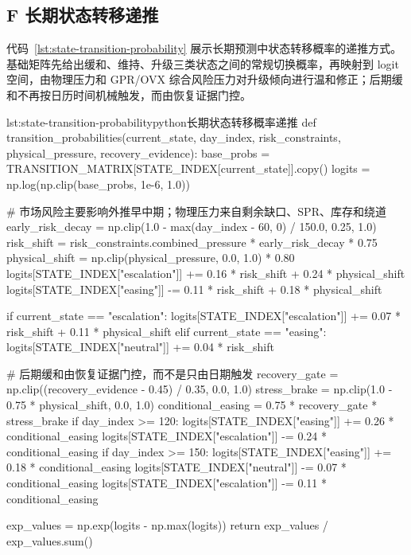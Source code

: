 \clearpage

\subsection*{F 长期状态转移递推}

代码~\ref{lst:state-transition-probability} 展示长期预测中状态转移概率的递推方式。基础矩阵先给出缓和、维持、升级三类状态之间的常规切换概率，再映射到 logit 空间，由物理压力和 GPR/OVX 综合风险压力对升级倾向进行温和修正；后期缓和不再按日历时间机械触发，而由恢复证据门控。

\begin{paperlisting}{lst:state-transition-probability}{python}{长期状态转移概率递推}
def transition_probabilities(current_state, day_index, risk_constraints,
                             physical_pressure, recovery_evidence):
    base_probs = TRANSITION_MATRIX[STATE_INDEX[current_state]].copy()
    logits = np.log(np.clip(base_probs, 1e-6, 1.0))

    # 市场风险主要影响外推早中期；物理压力来自剩余缺口、SPR、库存和绕道
    early_risk_decay = np.clip(1.0 - max(day_index - 60, 0) / 150.0,
                               0.25, 1.0)
    risk_shift = risk_constraints.combined_pressure * early_risk_decay * 0.75
    physical_shift = np.clip(physical_pressure, 0.0, 1.0) * 0.80
    logits[STATE_INDEX["escalation"]] += 0.16 * risk_shift + 0.24 * physical_shift
    logits[STATE_INDEX["easing"]] -= 0.11 * risk_shift + 0.18 * physical_shift

    if current_state == "escalation":
        logits[STATE_INDEX["escalation"]] += 0.07 * risk_shift + 0.11 * physical_shift
    elif current_state == "easing":
        logits[STATE_INDEX["neutral"]] += 0.04 * risk_shift

    # 后期缓和由恢复证据门控，而不是只由日期触发
    recovery_gate = np.clip((recovery_evidence - 0.45) / 0.35, 0.0, 1.0)
    stress_brake = np.clip(1.0 - 0.75 * physical_shift, 0.0, 1.0)
    conditional_easing = 0.75 * recovery_gate * stress_brake
    if day_index >= 120:
        logits[STATE_INDEX["easing"]] += 0.26 * conditional_easing
        logits[STATE_INDEX["escalation"]] -= 0.24 * conditional_easing
    if day_index >= 150:
        logits[STATE_INDEX["easing"]] += 0.18 * conditional_easing
        logits[STATE_INDEX["neutral"]] -= 0.07 * conditional_easing
        logits[STATE_INDEX["escalation"]] -= 0.11 * conditional_easing

    exp_values = np.exp(logits - np.max(logits))
    return exp_values / exp_values.sum()
\end{paperlisting}


